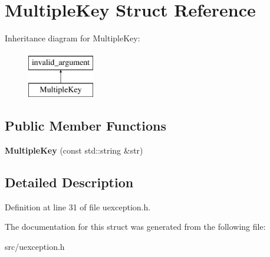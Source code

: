 \hypertarget{struct_multiple_key}{}\section{Multiple\+Key Struct Reference}
\label{struct_multiple_key}
Inheritance diagram for Multiple\+Key\+:\begin{figure}[H]
\begin{center}
\leavevmode
\includegraphics[height=2.000000cm]{struct_multiple_key}
\end{center}
\end{figure}
\subsection*{Public Member Functions}
\begin{DoxyCompactItemize}
\item 
\mbox{\label{struct_multiple_key_a383ebd6e3381b47e46cee51b99ae5cc7}} 
{\bfseries Multiple\+Key} (const std\+::string \&str)
\end{DoxyCompactItemize}


\subsection{Detailed Description}


Definition at line 31 of file uexception.\+h.



The documentation for this struct was generated from the following file\+:\begin{DoxyCompactItemize}
\item 
src/uexception.\+h\end{DoxyCompactItemize}
